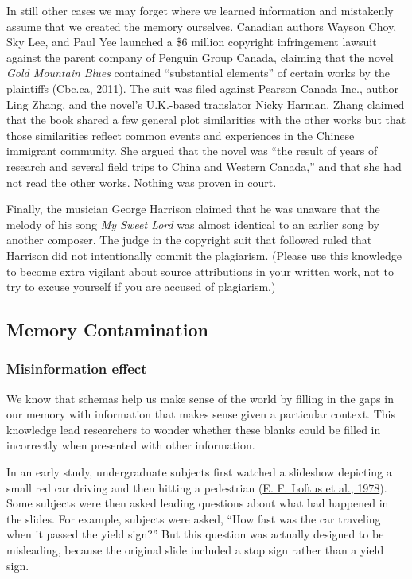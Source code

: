 \documentclass[
]{krantz}
\begin{document}
In still other cases we may forget where we learned information and mistakenly assume that we created the memory ourselves. Canadian authors Wayson Choy, Sky Lee, and Paul Yee launched a \$6 million copyright infringement lawsuit against the parent company of Penguin Group Canada, claiming that the novel \emph{Gold Mountain Blues} contained ``substantial elements'' of certain works by the plaintiffs (Cbc.ca, 2011). The suit was filed against Pearson Canada Inc., author Ling Zhang, and the novel's U.K.-based translator Nicky Harman. Zhang claimed that the book shared a few general plot similarities with the other works but that those similarities reflect common events and experiences in the Chinese immigrant community. She argued that the novel was ``the result of years of research and several field trips to China and Western Canada,'' and that she had not read the other works. Nothing was proven in court.

Finally, the musician George Harrison claimed that he was unaware that the melody of his song \emph{My Sweet Lord} was almost identical to an earlier song by another composer. The judge in the copyright suit that followed ruled that Harrison did not intentionally commit the plagiarism. (Please use this knowledge to become extra vigilant about source attributions in your written work, not to try to excuse yourself if you are accused of plagiarism.)

\hypertarget{memory-contamination}{%
\subsection*{Memory Contamination}\label{memory-contamination}}


\hypertarget{misinformation-effect}{%
\subsubsection*{Misinformation effect}\label{misinformation-effect}}


We know that schemas help us make sense of the world by filling in the gaps in our memory with information that makes sense given a particular context. This knowledge lead researchers to wonder whether these blanks could be filled in incorrectly when presented with other information.

In an early study, undergraduate subjects first watched a slideshow depicting a small red car driving and then hitting a pedestrian (\protect\hyperlink{ref-loftus1978semantic}{E. F. Loftus et al., 1978}). Some subjects were then asked leading questions about what had happened in the slides. For example, subjects were asked, ``How fast was the car traveling when it passed the yield sign?'' But this question was actually designed to be misleading, because the original slide included a stop sign rather than a yield sign.
\end{document}
